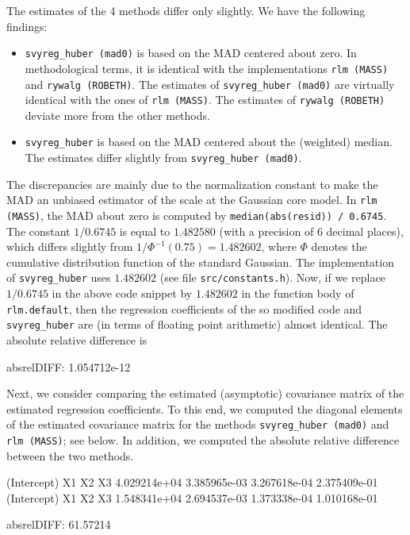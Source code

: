 \documentclass[a4paper,oneside,11pt,DIV=12]{scrartcl}
\newcommand{\code}[1]{{\texttt{#1}}}
\begin{document}
\noindent The estimates of the 4 methods differ only slightly. We have the
following findings:
\begin{itemize}
    \item \code{svyreg\_huber (mad0)} is based on the MAD centered about
        zero. In methodological terms, it is identical with the
        implementations \code{rlm (MASS)} and \code{rywalg (ROBETH)}. The
        estimates of \code{svyreg\_huber (mad0)} are virtually identical
        with the ones of \code{rlm (MASS)}.  The estimates of
        \code{rywalg (ROBETH)} deviate more from the other methods.
    \item \code{svyreg\_huber} is based on the MAD centered about the
        (weighted) median. The estimates differ slightly from
         \code{svyreg\_huber (mad0)}.
\end{itemize}

\noindent The discrepancies are mainly due to the normalization constant
to make the MAD an unbiased estimator of the scale at the Gaussian core
model. In \code{rlm (MASS)}, the MAD about zero is computed by
\code{median(abs(resid)) / 0.6745}. The constant $1 / 0.6745$ is
equal to $1.482580$ (with a precision of 6 decimal places), which
differs slightly from $1/\Phi^{-1}(0.75)=1.482602$, where $\Phi$ denotes
the cumulative distribution function of the standard Gaussian.
The implementation of \code{svyreg\_huber} uses $1.482602$
(see file \code{src/constants.h}). Now, if we replace $1 / 0.6745$ in the
above code snippet by $1.482602$ in the function body of \code{rlm.default},
then the regression coefficients of the so modified code and
\code{svyreg\_huber} are (in terms of floating point arithmetic) almost
identical. The absolute relative difference is

\begin{Schunk}
\begin{Soutput}
absrelDIFF:  1.054712e-12 %
\end{Soutput}
\end{Schunk}

Next, we consider comparing the estimated (asymptotic) covariance matrix of
the estimated regression coefficients. To this end, we computed the diagonal
elements of the estimated covariance matrix for the
methods \code{svyreg\_huber (mad0)} and \code{rlm (MASS)}; see below. In
addition, we computed the absolute relative difference between the two
methods.

\begin{Schunk}
\begin{Soutput}
 (Intercept)           X1           X2           X3 
4.029214e+04 3.385965e-03 3.267618e-04 2.375409e-01 
 (Intercept)           X1           X2           X3 
1.548341e+04 2.694537e-03 1.373338e-04 1.010168e-01 

absrelDIFF:  61.57214 %
\end{Soutput}
\end{Schunk}
\end{document}
